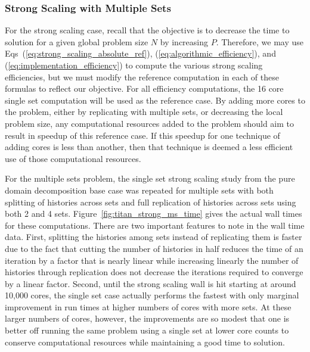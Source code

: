 \documentclass{snamc2013}
\begin{document}
\subsubsection{Strong Scaling with Multiple Sets}
\label{subsubsec:ms_strong}
For the strong scaling case, recall that the objective is to decrease
the time to solution for a given global problem size $N$ by increasing
$P$. Therefore, we may use Eqs~(\ref{eq:strong_scaling_absolute_ref}),
(\ref{eq:algorithmic_efficiency}), and
(\ref{eq:implementation_efficiency}) to compute the various strong
scaling efficiencies, but we must modify the reference computation in
each of these formulas to reflect our objective. For all efficiency
computations, the 16 core single set computation will be used as the
reference case. By adding more cores to the problem, either by
replicating with multiple sets, or decreasing the local problem size,
any computational resources added to the problem should aim to result
in speedup of this reference case. If this speedup for one technique
of adding cores is less than another, then that technique is deemed a
less efficient use of those computational resources.

For the multiple sets problem, the single set strong scaling study
from the pure domain decomposition base case was repeated for multiple
sets with both splitting of histories across sets and full replication
of histories across sets using both 2 and 4
sets. Figure~\ref{fig:titan_strong_ms_time} gives the actual wall
times for these computations. There are two important features to note
in the wall time data. First, splitting the histories among sets
instead of replicating them is faster due to the fact that cutting the
number of histories in half reduces the time of an iteration by a
factor that is nearly linear while increasing linearly the number of
histories through replication does not decrease the iterations
required to converge by a linear factor. Second, until the strong
scaling wall is hit starting at around 10,000 cores, the single set
case actually performs the fastest with only marginal improvement in
run times at higher numbers of cores with more sets. At these larger
numbers of cores, however, the improvements are so modest that one is
better off running the same problem using a single set at lower core
counts to conserve computational resources while maintaining a good
time to solution.
\end{document}
